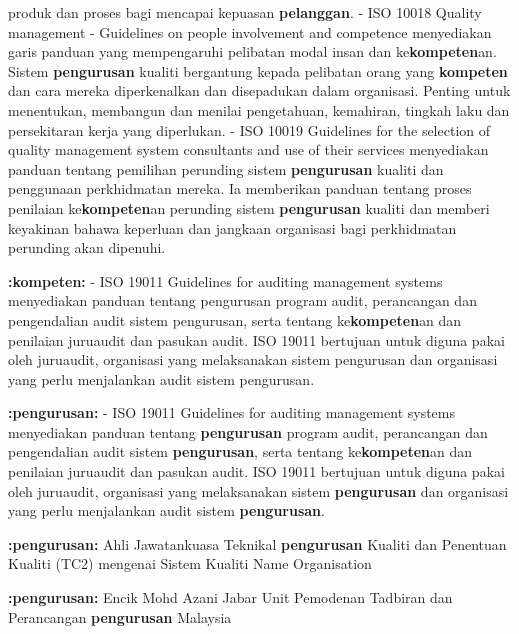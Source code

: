 \documentclass{article}
\begin{document}
 produk dan proses bagi mencapai kepuasan \textbf{pelanggan}.
- ISO 10018 Quality management - Guidelines on people involvement and competence
 menyediakan garis panduan yang mempengaruhi pelibatan modal insan dan
 ke\textbf{kompeten}an. Sistem \textbf{pengurusan} kualiti bergantung kepada pelibatan orang yang
 \textbf{kompeten} dan cara mereka diperkenalkan dan disepadukan dalam organisasi. Penting
 untuk menentukan, membangun dan menilai pengetahuan, kemahiran, tingkah laku dan
 persekitaran kerja yang diperlukan.
- ISO 10019 Guidelines for the selection of quality management system consultants and
 use of their services menyediakan panduan tentang pemilihan perunding sistem
 \textbf{pengurusan} kualiti dan penggunaan perkhidmatan mereka. Ia memberikan panduan
 tentang proses penilaian ke\textbf{kompeten}an perunding sistem \textbf{pengurusan} kualiti dan
 memberi keyakinan bahawa keperluan dan jangkaan organisasi bagi perkhidmatan
 perunding akan dipenuhi.

\textbf{:kompeten:} - ISO 19011 Guidelines for auditing management systems menyediakan panduan tentang
 pengurusan program audit, perancangan dan pengendalian audit sistem pengurusan,
 serta tentang ke\textbf{kompeten}an dan penilaian juruaudit dan pasukan audit. ISO 19011
 bertujuan untuk diguna pakai oleh juruaudit, organisasi yang melaksanakan sistem
 pengurusan dan organisasi yang perlu menjalankan audit sistem pengurusan.

\textbf{:pengurusan:} - ISO 19011 Guidelines for auditing management systems menyediakan panduan tentang
 \textbf{pengurusan} program audit, perancangan dan pengendalian audit sistem \textbf{pengurusan},
 serta tentang ke\textbf{kompeten}an dan penilaian juruaudit dan pasukan audit. ISO 19011
 bertujuan untuk diguna pakai oleh juruaudit, organisasi yang melaksanakan sistem
 \textbf{pengurusan} dan organisasi yang perlu menjalankan audit sistem \textbf{pengurusan}.

\textbf{:pengurusan:} Ahli Jawatankuasa Teknikal \textbf{pengurusan} Kualiti dan Penentuan Kualiti (TC2) mengenai
Sistem Kualiti
Name Organisation

\textbf{:pengurusan:} Encik Mohd Azani Jabar Unit Pemodenan Tadbiran dan
Perancangan \textbf{pengurusan} Malaysia
\end{document}
